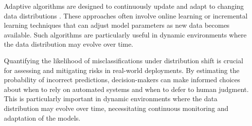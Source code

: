 Adaptive algorithms are designed to continuously update and adapt to changing data distributions \cite{lu2018learning, baena2006early}. These approaches often involve online learning or incremental learning techniques that can adjust model parameters as new data becomes available. Such algorithms are particularly useful in dynamic environments where the data distribution may evolve over time.

Quantifying the likelihood of misclassifications under distribution shift is crucial for assessing and mitigating risks in real-world deployments. By estimating the probability of incorrect predictions, decision-makers can make informed choices about when to rely on automated systems and when to defer to human judgment. This is particularly important in dynamic environments where the data distribution may evolve over time, necessitating continuous monitoring and adaptation of the models.

